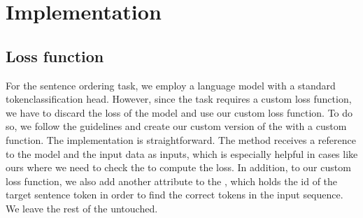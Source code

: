 \documentclass[letterpaper,10pt,english]{jupyterBook}
\begin{document}
\section{Implementation}
\label{\detokenize{HuggingFaceTrainer:implementation}}

\subsection{Loss function}
\label{\detokenize{HuggingFaceTrainer:loss-function}}
\sphinxAtStartPar
For the sentence ordering task, we employ a language model with a standard token\sphinxhyphen{}classification head.
However, since the task requires a custom loss function, we have to discard the loss of the model and use our custom loss function.
To do so, we follow the guidelines and create our custom version of the  with a custom  function.
The implementation  is straightforward.
The  method receives a reference to the model and the input data as inputs, which is especially helpful in cases like ours where we need to check the  to compute the loss.
In addition, to our custom loss function, we also add another attribute to the , which holds the id of the target sentence token in order to find the correct tokens in the input sequence.
We leave the rest of the  untouched.
\end{document}
